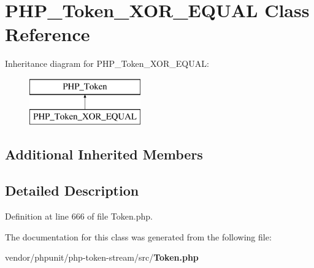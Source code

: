 \section{P\+H\+P\+\_\+\+Token\+\_\+\+X\+O\+R\+\_\+\+E\+Q\+U\+A\+L Class Reference}
\label{class_p_h_p___token___x_o_r___e_q_u_a_l}
Inheritance diagram for P\+H\+P\+\_\+\+Token\+\_\+\+X\+O\+R\+\_\+\+E\+Q\+U\+A\+L\+:\begin{figure}[H]
\begin{center}
\leavevmode
\includegraphics[height=2.000000cm]{class_p_h_p___token___x_o_r___e_q_u_a_l}
\end{center}
\end{figure}
\subsection*{Additional Inherited Members}


\subsection{Detailed Description}


Definition at line 666 of file Token.\+php.



The documentation for this class was generated from the following file\+:\begin{DoxyCompactItemize}
\item 
vendor/phpunit/php-\/token-\/stream/src/{\bf Token.\+php}\end{DoxyCompactItemize}
